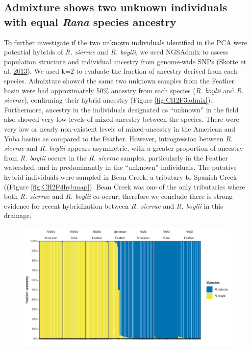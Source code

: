 \documentclass[proquest,12pt,final]{ucthesis-CA2012} %
\begin{document}
\begin{ucmainmatter}
\hypertarget{admixture-shows-two-unknown-individuals-with-equal-rana-species-ancestry}{%
\subsection{\texorpdfstring{Admixture shows two unknown individuals with
equal \emph{Rana} species
ancestry}{Admixture shows two unknown individuals with equal Rana species ancestry}}\label{admixture-shows-two-unknown-individuals-with-equal-rana-species-ancestry}}

To further investigate if the two unknown individuals identified in the
PCA were potential hybrids of \emph{R. sierrae} and \emph{R. boylii}, we
used NGSAdmix to assess population structure and individual ancestry
from genome-wide SNPs (Skotte et al.
\protect\hyperlink{ref-skotte_estimating_2013}{2013}). We used k=2 to
evaluate the fraction of ancestry derived from each species. Admixture
showed the same two unknown samples from the Feather basin were had
approximately 50\% ancestry from each species (\emph{R. boylii} and
\emph{R. sierrae}), confirming their hybrid ancestry (Figure
\ref{fig:CH2F3admix}). Furthermore, ancestry in the individuals
designated as ``unknown'' in the field also showed very low levels of
mixed ancestry between the species. There were very low or nearly
non-existent levels of mixed-ancestry in the American and Yuba basins as
compared to the Feather. However, introgression between \emph{R.
sierrae} and \emph{R. boylii} appears asymmetric, with a greater
proportion of ancestry from \emph{R. boylii} occurs in the \emph{R.
sierrae} samples, particularly in the Feather watershed, and in
predominantly in the ``unknown'' individuals. The putative hybrid
individuals were sampled in Bean Creek, a tributary to Spanish Creek
((Figure \ref{fig:CH2F4hybmap}). Bean Creek was one of the only
tributaries where both \emph{R. sierrae} and \emph{R. boylii} co-occur;
therefore we conclude there is strong evidence for recent hybridization
between \emph{R. sierrae} and \emph{R. boylii} in this drainage.




\begin{figure}

{\centering \includegraphics[width=1\linewidth]{figure/ch2/figure_03_admix_rana_by_watershed_25k_k2} 

}
\end{figure}
\end{ucmainmatter}
\end{document}
